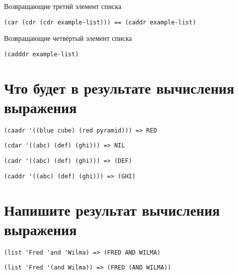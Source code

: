 \problem Возвращающие третий элемент списка
\begin{lstlisting}
(car (cdr (cdr example-list))) == (caddr example-list)
\end{lstlisting}


\problem Возвращающие четвёртый элемент списка
\begin{lstlisting}
(cadddr example-list)
\end{lstlisting}



\section{Что будет в результате вычисления выражения}

\problem \hfill

\begin{lstlisting}
(caadr '((blue cube) (red pyramid))) => RED
\end{lstlisting}


\problem \hfill

\begin{lstlisting}
(cdar '((abc) (def) (ghi))) => NIL
\end{lstlisting}


\problem \hfill

\begin{lstlisting}
(cadr '((abc) (def) (ghi))) => (DEF)
\end{lstlisting}


\problem \hfill

\begin{lstlisting}
(caddr '((abc) (def) (ghi))) => (GHI)
\end{lstlisting}



\section{Напишите результат вычисления выражения}

\problem \hfill

\begin{lstlisting}
(list 'Fred 'and 'Wilma) => (FRED AND WILMA)
\end{lstlisting}


\problem \hfill

\begin{lstlisting}
(list 'Fred '(and Wilma)) => (FRED (AND WILMA))
\end{lstlisting}


